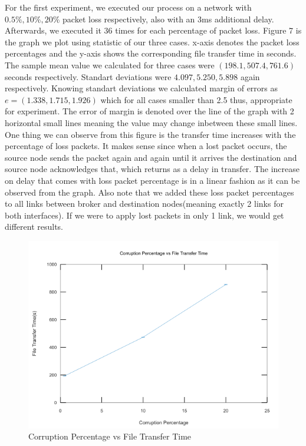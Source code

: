 \documentclass[conference]{IEEEtran}
\begin{document}
For the first experiment, we executed our process on a network with $0.5\%,10\%,20\% $ packet loss respectively, also with an 3ms additional delay. Afterwards, we executed it $36$ times for each percentage of packet loss. Figure 7 is the graph we plot using statistic of our three cases. x-axis denotes the packet loss percentages and the y-axis shows the corresponding file transfer time in seconds. The sample mean value we calculated for three cases were $(198.1 , 507.4 , 761.6)$ seconds respectively. Standart deviations were $4.097, 5.250, 5.898$ again respectively. Knowing standart deviations we calculated margin of errors as $e=(1.338 , 1.715 , 1.926)$ which for all cases smaller than 2.5 thus, appropriate for experiment. The error of margin is denoted over the line of the graph with 2 horizontal small lines meaning the value may change inbetween these small lines. One thing we can observe from this figure is the transfer time increases with the percentage of loss packets. It makes sense since when a lost packet occurs, the source node sends the packet again and again until it arrives the destination and source node acknowledges that, which returns as a delay in transfer. The increase on delay that comes with loss packet percentage is in a linear fashion as it can be observed from the graph. Also note that we added these loss packet percentages to all links between broker and destination nodes(meaning exactly 2 links for both interfaces). If we were to apply lost packets in only 1 link, we would get different results.  


\begin{figure}[h]
    \centering
    \includegraphics[scale=0.45]{graph2.png}
    \caption{Corruption Percentage vs File Transfer Time}
\end{figure}
\end{document}
